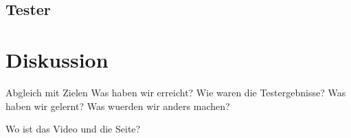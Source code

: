 \subsection{Tester}

\section{Diskussion}
Abgleich mit Zielen
Was haben wir erreicht?
Wie waren die Testergebnisse?
Was haben wir gelernt?
Was wuerden wir anders machen?

Wo ist das Video und die Seite?